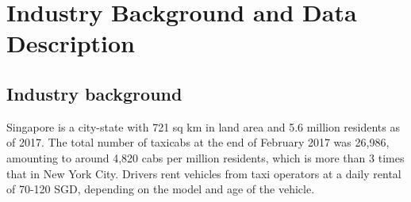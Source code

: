\documentclass[reviewmode,AEJ]{AEA}
\begin{document}
\section{Industry Background and Data Description}
\label{sec:background}

\subsection{Industry background}
Singapore is a city-state with 721 sq km in land area and 5.6 million residents as of 2017. 
The total number of taxicabs at the end of February 2017 was 26,986, amounting to around 4,820 cabs
per million residents, which is more than 3 times that in New York City. 
Drivers rent vehicles from taxi operators at a daily rental of 70-120 SGD, depending on the model and age of the vehicle.
\end{document}
